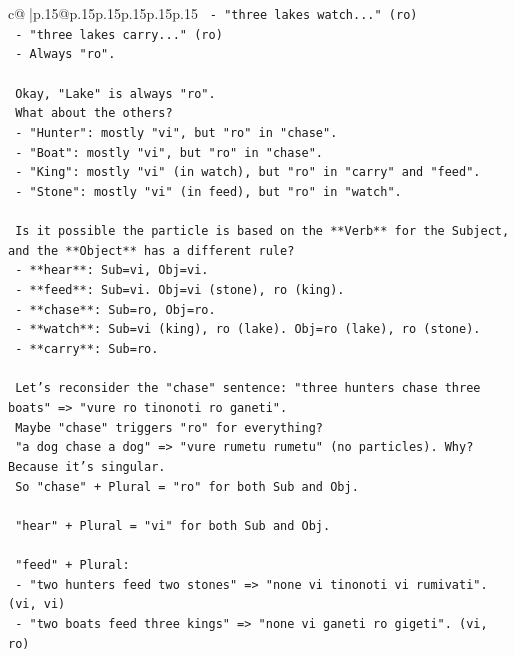 \documentclass{article}
\begin{document}
{\begin{supertabular}{c@{$\;$}|p{.15\linewidth}@{}p{.15\linewidth}p{.15\linewidth}p{.15\linewidth}p{.15\linewidth}p{.15\linewidth}}
{{{\texttt{        {-} "three lakes watch..." (ro)} \\
\texttt{        {-} "three lakes carry..." (ro)} \\
\texttt{        {-} Always "ro".} \\
\\ 
\texttt{    Okay, "Lake" is always "ro".} \\
\texttt{    What about the others?} \\
\texttt{    {-} "Hunter": mostly "vi", but "ro" in "chase".} \\
\texttt{    {-} "Boat": mostly "vi", but "ro" in "chase".} \\
\texttt{    {-} "King": mostly "vi" (in watch), but "ro" in "carry" and "feed".} \\
\texttt{    {-} "Stone": mostly "vi" (in feed), but "ro" in "watch".} \\
\\ 
\texttt{    Is it possible the particle is based on the **Verb** for the Subject, and the **Object** has a different rule?} \\
\texttt{    {-} **hear**: Sub=vi, Obj=vi.} \\
\texttt{    {-} **feed**: Sub=vi. Obj=vi (stone), ro (king).} \\
\texttt{    {-} **chase**: Sub=ro, Obj=ro.} \\
\texttt{    {-} **watch**: Sub=vi (king), ro (lake). Obj=ro (lake), ro (stone).} \\
\texttt{    {-} **carry**: Sub=ro.} \\
\\ 
\texttt{    Let's reconsider the "chase" sentence: "three hunters chase three boats" => "vure ro tinonoti ro ganeti".} \\
\texttt{    Maybe "chase" triggers "ro" for everything?} \\
\texttt{    "a dog chase a dog" => "vure rumetu rumetu" (no particles). Why? Because it's singular.} \\
\texttt{    So "chase" + Plural = "ro" for both Sub and Obj.} \\
\\ 
\texttt{    "hear" + Plural = "vi" for both Sub and Obj.} \\
\\ 
\texttt{    "feed" + Plural:} \\
\texttt{    {-} "two hunters feed two stones" => "none vi tinonoti vi rumivati". (vi, vi)} \\
\texttt{    {-} "two boats feed three kings" => "none vi ganeti ro gigeti". (vi, ro)} \\
}}}
\end{supertabular}}
\end{document}
